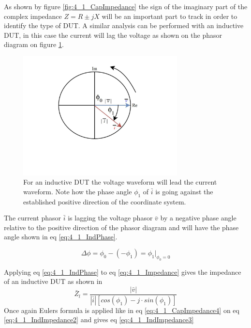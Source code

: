 As shown by figure \ref{fig:4_1_CapImpedance} the sign of the imaginary part of the complex impedance $Z = R \pm jX$ will be an important part to track in order to identify the type of DUT. A similar analysis can be performed with an inductive DUT, in this case the current will lag the voltage as shown on the phasor diagram on figure \ref{fig:4_1_IndPhasor}.
\begin{figure}[H]
    \centering
    \includegraphics[clip, trim=0 175 0 0, width=0.75\textwidth]{Sections/4_TechnicalAnalysis/Figures/4_1_InductivePhasor.pdf}
    \caption{For an inductive DUT the voltage waveform will lead the current waveform. Note how the phase angle $\phi_1$ of $\bar i$ is going against the established positive direction of the coordinate system.}
    \label{fig:4_1_IndPhasor}
\end{figure}

The current phasor $\bar i$ is lagging the voltage phasor $\bar v$ by a negative phase angle relative to the positive direction of the phasor diagram and will have the phase angle shown in eq \ref{eq:4_1_IndPhase}.

\begin{equation}\label{eq:4_1_IndPhase}
    \Delta \phi = \phi_0 -(-\phi_1) =\phi_1 \bigg\rvert_{\phi_0 = 0}
\end{equation}

Applying eq \ref{eq:4_1_IndPhase} to eq \ref{eq:4_1_Impedance} gives the impedance of an inductive DUT as shown in 
\begin{equation}\label{eq:4_1_IndImpedance2}
    \bar Z_l = \frac{|\bar v|}{|\bar i| [cos(\phi_1) -j\cdot sin(\phi_1)]}
\end{equation}
Once again Eulers formula is applied like in eq \ref{eq:4_1_CapImpedance4} on eq \ref{eq:4_1_IndImpedance2} and gives eq \ref{eq:4_1_IndImpedance3}

